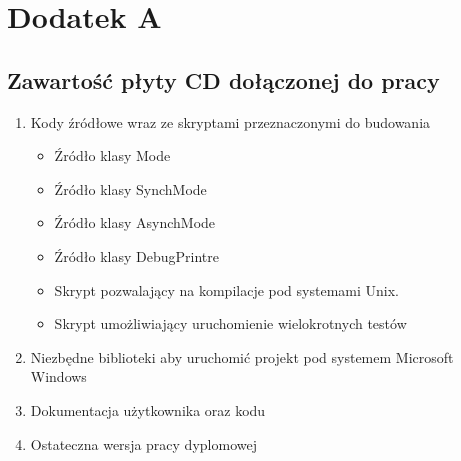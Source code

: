 \documentclass{BscUS}
\begin{document}
\newpage
\pagestyle{empty}
\appendix
\chapter*{Dodatek A} \label{App:AppendixA}
\section*{Zawartość płyty CD dołączonej do pracy}

\begin{enumerate}
\item Kody źródłowe wraz ze skryptami przeznaczonymi do budowania
\begin{itemize}
\item Źródło klasy Mode
\item Źródło klasy SynchMode
\item Źródło klasy AsynchMode
\item Źródło klasy DebugPrintre
\item Skrypt pozwalający na kompilacje pod systemami Unix.
\item Skrypt umożliwiający uruchomienie wielokrotnych testów
\end{itemize}
\item Niezbędne biblioteki aby uruchomić projekt pod systemem Microsoft Windows
\item Dokumentacja użytkownika oraz kodu
\item Ostateczna wersja pracy dyplomowej
\end{enumerate}
\end{document}
